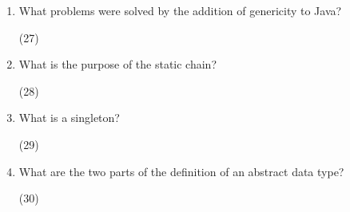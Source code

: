 \begin{enumerate}

  \item What problems were solved by the addition
    of genericity to Java?

   \begin{answer}
    (27)
    \end{answer}

  \item What is the purpose of the static chain?

    \begin{answer}
    (28)
    \end{answer}
  \item What is a singleton?

    \begin{answer}
    (29)
    \end{answer}

  \item What are the two parts of the definition 
    of an abstract data type?

   \begin{answer}
    (30)
    \end{answer}

  \end{enumerate}


